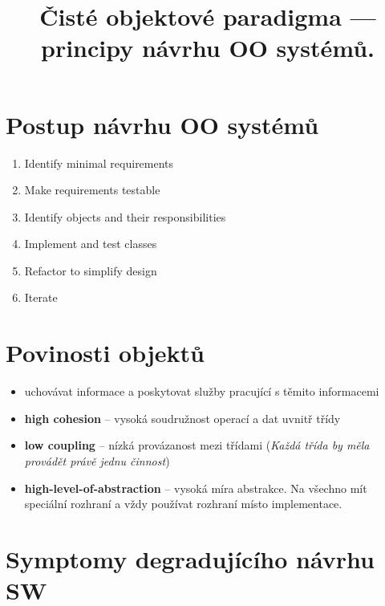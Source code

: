 \documentclass{szzclass}
\title{Čisté objektové paradigma — principy návrhu OO systémů.}
\begin{document}
\maketitle

\tableofcontents
\newpage

\section{Postup návrhu OO systémů}

\begin{enumerate}
      \item Identify minimal requirements
      \item Make requirements testable
      \item Identify objects and their responsibilities
      \item Implement and test classes
      \item Refactor to simplify design
      \item Iterate
\end{enumerate}

\section{Povinosti objektů}

\begin{itemize}
      \item uchovávat informace a poskytovat služby pracující s těmito informacemi
      \item \textbf{high cohesion} -- vysoká soudružnost operací a dat uvnitř třídy
      \item \textbf{low coupling} -- nízká provázanost mezi třídami 
      (\textit{Každá třída by měla provádět právě jednu činnost})
      \item \textbf{high-level-of-abstraction} -- vysoká míra abstrakce.
      Na všechno mít speciální rozhraní a vždy používat rozhraní místo implementace.
\end{itemize}


\section{Symptomy degradujícího návrhu SW}
\end{document}
